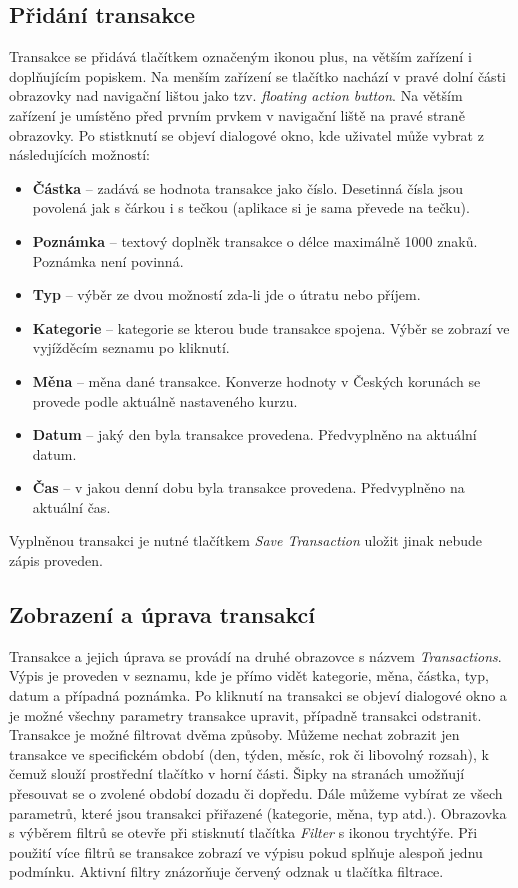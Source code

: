\documentclass[
  biblatex,
  figures=true,
  tables=false,
  glossaries,
  index
]{kidiplom}
\begin{document}
\subsection{Přidání transakce}
Transakce se přidává tlačítkem označeným ikonou plus, na větším zařízení i doplňujícím popiskem. Na menším zařízení se tlačítko nachází v pravé dolní části obrazovky nad navigační lištou jako tzv. \textit{floating action button}. Na větším zařízení je umístěno před prvním prvkem v navigační liště na pravé straně obrazovky. Po stistknutí se objeví dialogové okno, kde uživatel může vybrat z následujících možností:
\begin{itemize}
  \item \textbf{Částka} -- zadává se hodnota transakce jako číslo. Desetinná čísla jsou povolená jak s čárkou i s tečkou (aplikace si je sama převede na tečku).
  \item \textbf{Poznámka} -- textový doplněk transakce o délce maximálně 1000 znaků.  Poznámka není povinná.
  \item \textbf{Typ} -- výběr ze dvou možností zda-li jde o útratu nebo příjem.
  \item \textbf{Kategorie} -- kategorie se kterou bude transakce spojena. Výběr se zobrazí ve vyjížděcím seznamu po kliknutí.
  \item \textbf{Měna} -- měna dané transakce. Konverze hodnoty v Českých korunách se provede podle aktuálně nastaveného kurzu.
  \item \textbf{Datum} -- jaký den byla transakce provedena. Předvyplněno na aktuální datum.
  \item \textbf{Čas} -- v jakou denní dobu byla transakce provedena. Předvyplněno na aktuální čas.
\end{itemize}
Vyplněnou transakci je nutné tlačítkem \textit{Save Transaction} uložit jinak nebude zápis proveden.

\subsection{Zobrazení a úprava transakcí}
Transakce a jejich úprava se provádí na druhé obrazovce s názvem \textit{Transactions}. Výpis je proveden v seznamu, kde je přímo vidět kategorie, měna, částka, typ, datum a případná poznámka. Po kliknutí na transakci se objeví dialogové okno a je možné všechny parametry transakce upravit, případně transakci odstranit. Transakce je možné filtrovat dvěma způsoby. Můžeme nechat zobrazit jen transakce ve specifickém období (den, týden, měsíc, rok či libovolný rozsah), k čemuž slouží prostřední tlačítko v horní části. Šipky na stranách umožňují přesouvat se o zvolené období dozadu či dopředu. Dále můžeme vybírat ze všech parametrů, které jsou transakci přiřazené (kategorie, měna, typ atd.). Obrazovka s výběrem filtrů se otevře při stisknutí tlačítka \textit{Filter} s ikonou trychtýře. Při použití více filtrů se transakce zobrazí ve výpisu pokud splňuje alespoň jednu podmínku. Aktivní filtry znázorňuje červený odznak u tlačítka filtrace.
\end{document}

